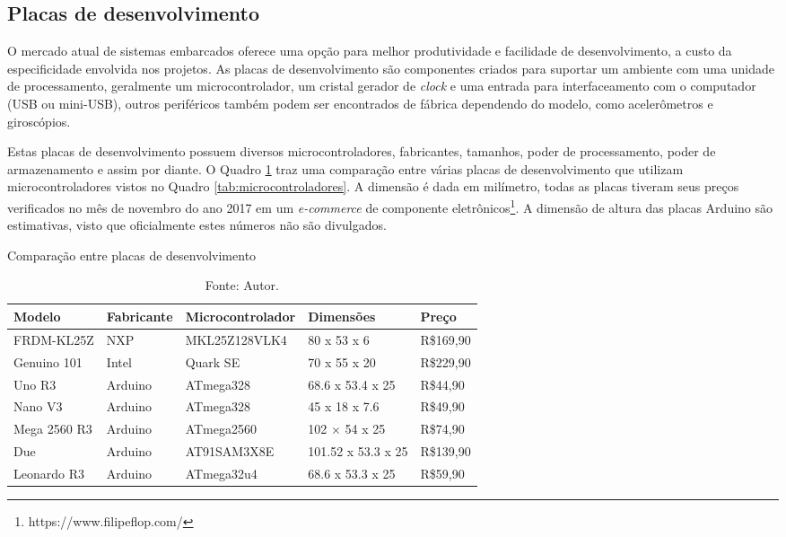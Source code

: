 \subsection{Placas de desenvolvimento} 
\label{sec:placasdedesenvolvimento}

O mercado atual de sistemas embarcados oferece uma opção para melhor produtividade e facilidade de desenvolvimento, a custo da especificidade envolvida nos projetos. As placas de desenvolvimento são componentes criados para suportar um ambiente com uma unidade de processamento, geralmente um microcontrolador, um cristal gerador de \textit{clock} e uma entrada para interfaceamento com o computador (USB ou mini-USB), outros periféricos também podem ser encontrados de fábrica dependendo do modelo, como acelerômetros e giroscópios. 

Estas placas de desenvolvimento possuem diversos microcontroladores, fabricantes, tamanhos, poder de processamento, poder de armazenamento e assim por diante. O Quadro \ref{tab:placasdedesenvolvimento} traz uma comparação entre várias placas de desenvolvimento que utilizam microcontroladores vistos no Quadro \ref{tab:microcontroladores}. A dimensão é dada em milímetro, todas as placas tiveram seus preços verificados no mês de novembro do ano 2017 em um \textit{e-commerce} de componente eletrônicos\footnote{https://www.filipeflop.com/}. A dimensão de altura das placas Arduino são estimativas, visto que oficialmente estes números não são divulgados. 

\begin{table}[!htb]
	\centering
	\caption{Comparação entre placas de desenvolvimento}
	\label{tab:placasdedesenvolvimento}
	\begin{tabular}{|l|l|l|l|l|}
	\hline
	\rowcolor[HTML]{9B9B9B} 
	\textbf{Modelo}      & \textbf{Fabricante} & \textbf{Microcontrolador} & \textbf{Dimensões} & \textbf{Preço} \\ \hline
	FRDM-KL25Z		   & NXP                 & MKL25Z128VLK4             & 80 x 53 x 6        & R\$169,90      \\ \hline
	Genuino 101        & Intel               & Quark SE                  & 70 x 55 x 20       & R\$229,90      \\ \hline
	Uno R3             & Arduino             & ATmega328                 & 68.6 x 53.4 x 25   & R\$44,90       \\ \hline
	Nano V3            & Arduino             & ATmega328                 & 45 x 18 x 7.6      & R\$49,90       \\ \hline
	Mega 2560 R3       & Arduino             & ATmega2560                & 102 × 54 x 25      & R\$74,90       \\ \hline
	Due                & Arduino             & AT91SAM3X8E               & 101.52 x 53.3 x 25 & R\$139,90      \\ \hline
	Leonardo R3        & Arduino             & ATmega32u4                & 68.6 x 53.3 x 25   & R\$59,90       \\ \hline
	\end{tabular}
	\caption*{Fonte: Autor.}
\end{table}

